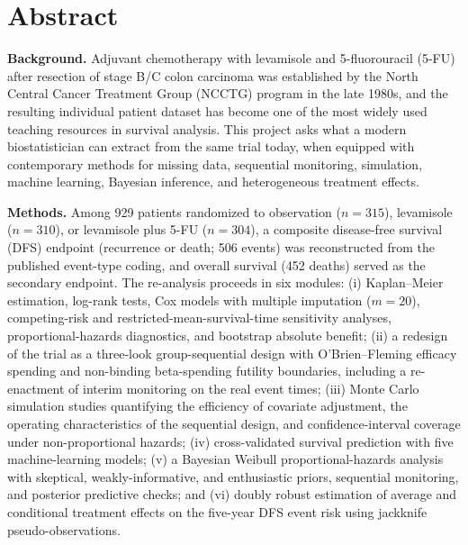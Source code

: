 \section*{Abstract}

\textbf{Background.} Adjuvant chemotherapy with levamisole and
5-fluorouracil (5-FU) after resection of stage B/C colon carcinoma was
established by the North Central Cancer Treatment Group (NCCTG) program in
the late 1980s, and the resulting individual patient dataset has become one
of the most widely used teaching resources in survival analysis. This
project asks what a modern biostatistician can extract from the same trial
today, when equipped with contemporary methods for missing data, sequential
monitoring, simulation, machine learning, Bayesian inference, and
heterogeneous treatment effects.

\smallskip
\noindent\textbf{Methods.} Among 929 patients randomized to observation
($n=315$), levamisole ($n=310$), or levamisole plus 5-FU ($n=304$), a
composite disease-free survival (DFS) endpoint (recurrence or death; 506
events) was reconstructed from the published event-type coding, and overall
survival (452 deaths) served as the secondary endpoint. The re-analysis
proceeds in six modules: (i) Kaplan--Meier estimation, log-rank tests,
Cox models with multiple imputation ($m=20$), competing-risk and
restricted-mean-survival-time sensitivity analyses, proportional-hazards
diagnostics, and bootstrap absolute
benefit; (ii) a redesign of the trial as a three-look group-sequential
design with O'Brien--Fleming efficacy spending and non-binding beta-spending
futility boundaries, including a re-enactment of interim monitoring on the
real event times; (iii) Monte Carlo simulation studies quantifying the
efficiency of covariate adjustment, the operating characteristics of the
sequential design, and confidence-interval coverage under non-proportional
hazards; (iv) cross-validated survival prediction with five
machine-learning models; (v) a Bayesian Weibull proportional-hazards
analysis with skeptical, weakly-informative, and enthusiastic priors,
sequential monitoring, and posterior predictive checks; and (vi) doubly
robust estimation of average and conditional treatment effects on the
five-year DFS event risk using jackknife pseudo-observations.

